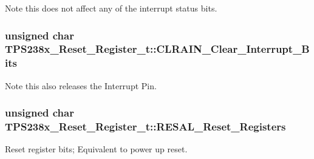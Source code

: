 Note this does not affect any of the interrupt status bits. 

\hypertarget{struct_t_p_s238x___reset___register__t_ab752db3abb368003735ed08064993e74}{
\subsubsection[{C\-L\-R\-A\-I\-N\-\_\-\-Clear\-\_\-\-Interrupt\-\_\-\-Bits}]{\setlength{\rightskip}{0pt plus 5cm}unsigned char T\-P\-S238x\-\_\-\-Reset\-\_\-\-Register\-\_\-t\-::\-C\-L\-R\-A\-I\-N\-\_\-\-Clear\-\_\-\-Interrupt\-\_\-\-Bits}}\label{struct_t_p_s238x___reset___register__t_ab752db3abb368003735ed08064993e74}


Note this also releases the Interrupt Pin. 

\hypertarget{struct_t_p_s238x___reset___register__t_ad0b5086b9fae842561d092c1ef650295}{
\subsubsection[{R\-E\-S\-A\-L\-\_\-\-Reset\-\_\-\-Registers}]{\setlength{\rightskip}{0pt plus 5cm}unsigned char T\-P\-S238x\-\_\-\-Reset\-\_\-\-Register\-\_\-t\-::\-R\-E\-S\-A\-L\-\_\-\-Reset\-\_\-\-Registers}}\label{struct_t_p_s238x___reset___register__t_ad0b5086b9fae842561d092c1ef650295}


Reset register bits; Equivalent to power up reset. 

